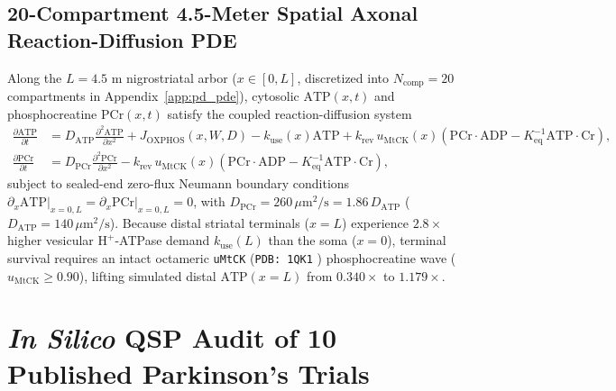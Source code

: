 \documentclass[11pt]{article}
\theoremstyle{plain}
\begin{document}
\subsection{20-Compartment 4.5-Meter Spatial Axonal Reaction-Diffusion PDE}
Along the $L = 4.5\text{ m}$ nigrostriatal arbor ($x \in [0, L]$, discretized into $N_{\mathrm{comp}} = 20$ compartments in Appendix~\ref{app:pd_pde}), cytosolic $\mathrm{ATP}(x,t)$ and phosphocreatine $\mathrm{PCr}(x,t)$ satisfy the coupled reaction-diffusion system
\begin{align}
  \frac{\partial\mathrm{ATP}}{\partial t} &= D_{\mathrm{ATP}}\frac{\partial^2\mathrm{ATP}}{\partial x^2} + J_{\mathrm{OXPHOS}}(x,W,D) - k_{\mathrm{use}}(x)\mathrm{ATP} + k_{\mathrm{rev}}\,u_{\mathrm{MtCK}}(x)\left(\mathrm{PCr}\cdot\mathrm{ADP} - K_{\mathrm{eq}}^{-1}\mathrm{ATP}\cdot\mathrm{Cr}\right), \nonumber\\
  \frac{\partial\mathrm{PCr}}{\partial t} &= D_{\mathrm{PCr}}\frac{\partial^2\mathrm{PCr}}{\partial x^2} - k_{\mathrm{rev}}\,u_{\mathrm{MtCK}}(x)\left(\mathrm{PCr}\cdot\mathrm{ADP} - K_{\mathrm{eq}}^{-1}\mathrm{ATP}\cdot\mathrm{Cr}\right),
  \label{eq:pde_axonal}
\end{align}
subject to sealed-end zero-flux Neumann boundary conditions $\partial_x\mathrm{ATP}\big|_{x=0,L} = \partial_x\mathrm{PCr}\big|_{x=0,L} = 0$, with $D_{\mathrm{PCr}} = 260\,\mu\mathrm{m}^2/\mathrm{s} = 1.86\,D_{\mathrm{ATP}}$ ($D_{\mathrm{ATP}} = 140\,\mu\mathrm{m}^2/\mathrm{s}$). Because distal striatal terminals ($x = L$) experience $2.8\times$ higher vesicular $\mathrm{H}^+$-ATPase demand $k_{\mathrm{use}}(L)$ than the soma ($x = 0$), terminal survival requires an intact octameric \texttt{uMtCK} (\texttt{PDB: 1QK1} \cite{eder2000umtck}) phosphocreatine wave ($u_{\mathrm{MtCK}} \ge 0.90$), lifting simulated distal $\mathrm{ATP}(x=L)$ from $0.340\times$ to $1.179\times$.

\section{\textit{In Silico} QSP Audit of 10 Published Parkinson's Trials}
\end{document}
